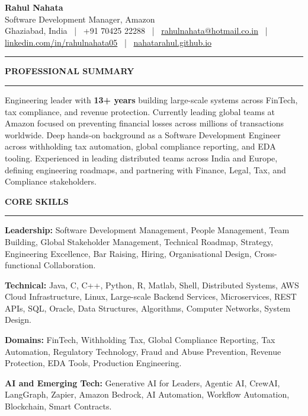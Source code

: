 \documentclass[9pt,a4paper]{extarticle}
\newcommand{\cvsection}[1]{%
  \vspace{2pt}%
  {\normalsize\bfseries\color{textdark}\MakeUppercase{#1}}\par
  \vspace{-1pt}%
  {\color{accent}\rule{\linewidth}{0.6pt}}\par
  \vspace{0pt}%
}
\begin{document}
\pagestyle{empty}
\setlength{\parindent}{0pt}

\begin{center}
  {\fontsize{18pt}{20pt}\selectfont\bfseries Rahul Nahata}\\[0pt]
  {\small Software Development Manager, Amazon}\\[0pt]
  {\scriptsize Ghaziabad, India ~|~ +91 70425 22288 ~|~
   \href{mailto:rahulnahata@hotmail.co.in}{rahulnahata@hotmail.co.in} ~|~
   \href{https://linkedin.com/in/rahulnahata05}{linkedin.com/in/rahulnahata05} ~|~
   \href{https://nahatarahul.github.io}{nahatarahul.github.io}}
\end{center}
\vspace{0pt}
{\color{accent}\rule{\linewidth}{0.7pt}}

\small

\cvsection{Professional Summary}
Engineering leader with \textbf{13+ years} building large-scale systems across FinTech,
tax compliance, and revenue protection. Currently leading global teams at Amazon focused
on preventing financial losses across millions of transactions worldwide. Deep hands-on
background as a Software Development Engineer across withholding tax automation, global
compliance reporting, and EDA tooling. Experienced in leading distributed teams across
India and Europe, defining engineering roadmaps, and partnering with Finance, Legal, Tax,
and Compliance stakeholders.

\cvsection{Core Skills}
\textbf{Leadership:} Software Development Management, People Management, Team Building,
Global Stakeholder Management, Technical Roadmap, Strategy, Engineering Excellence,
Bar Raising, Hiring, Organisational Design, Cross-functional Collaboration.\par\vspace{2pt}
\textbf{Technical:} Java, C, C++, Python, R, Matlab, Shell, Distributed Systems,
AWS Cloud Infrastructure, Linux, Large-scale Backend Services, Microservices, REST APIs,
SQL, Oracle, Data Structures, Algorithms, Computer Networks, System Design.\par\vspace{2pt}
\textbf{Domains:} FinTech, Withholding Tax, Global Compliance Reporting, Tax Automation,
Regulatory Technology, Fraud and Abuse Prevention, Revenue Protection, EDA Tools,
Production Engineering.\par\vspace{2pt}
\textbf{AI and Emerging Tech:} Generative AI for Leaders, Agentic AI, CrewAI, LangGraph,
Zapier, Amazon Bedrock, AI Automation, Workflow Automation, Blockchain, Smart Contracts.
\end{document}
